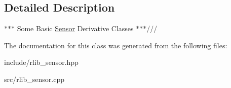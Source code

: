 \subsection{Detailed Description}
$\ast$$\ast$$\ast$ Some Basic \hyperlink{classrlib_1_1Sensor}{Sensor} Derivative Classes $\ast$$\ast$$\ast$/// 

The documentation for this class was generated from the following files\-:\begin{DoxyCompactItemize}
\item 
include/rlib\-\_\-sensor.\-hpp\item 
src/rlib\-\_\-sensor.\-cpp\end{DoxyCompactItemize}
